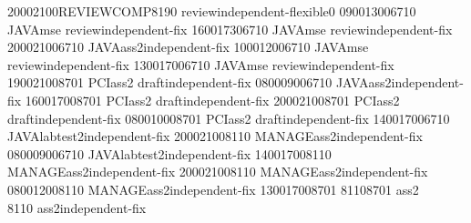 \documentclass[a3paper,10pt]{report}
\begin{document}
\begin{landscape}
\begin{multicols}{2}
\begin{center}
\begin{timetable}
   {2000}{2100}{REVIEW}{COMP8190 review}{}{independent-flexible}{0}
   {0900}{1300}{6710 JAVA}{mse review}{}{independent-fix}
   {1600}{1730}{6710 JAVA}{mse review}{}{independent-fix}
   {2000}{2100}{6710 JAVA}{ass2}{}{independent-fix}
   {1000}{1200}{6710 JAVA}{mse review}{}{independent-fix}
   {1300}{1700}{6710 JAVA}{mse review}{}{independent-fix}
   {1900}{2100}{8701 PCI}{ass2 draft}{}{independent-fix}
   {0800}{0900}{6710 JAVA}{ass2}{}{independent-fix}
   {1600}{1700}{8701 PCI}{ass2 draft}{}{independent-fix}
   {2000}{2100}{8701 PCI}{ass2 draft}{}{independent-fix}
   {0800}{1000}{8701 PCI}{ass2 draft}{}{independent-fix}
   {1400}{1700}{6710 JAVA}{labtest2}{}{independent-fix}
   {2000}{2100}{8110 MANAGE}{ass2}{}{independent-fix}
   {0800}{0900}{6710 JAVA}{labtest2}{}{independent-fix}
   {1400}{1700}{8110 MANAGE}{ass2}{}{independent-fix}
   {2000}{2100}{8110 MANAGE}{ass2}{}{independent-fix}
   {0800}{1200}{8110 MANAGE}{ass2}{}{independent-fix}
   {1300}{1700}{8701 8110}{8701 ass2\\8110 ass2}{}{independent-fix}


\end{timetable}

\end{center}



\end{multicols}
\end{landscape}
\end{document}
